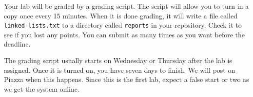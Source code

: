 \documentclass[12pt]{article}
\begin{document}
Your lab will be graded by a grading script.  The script will allow you to turn in a copy once every
15 minutes.  When it is done grading, it will write a file called \texttt{linked-lists.txt} to a
directory called \texttt{reports} in your repository.  Check it to see if you lost any points.  You
can submit as many times as you want before the deadline.

The grading script usually starts on Wednesday or Thursday after the lab is assigned.  Once it is
turned on, you have seven days to finish.  We will post on Piazza when this happens.  Since this is
the first lab, expect a false start or two as we get the system online.
\end{document}
